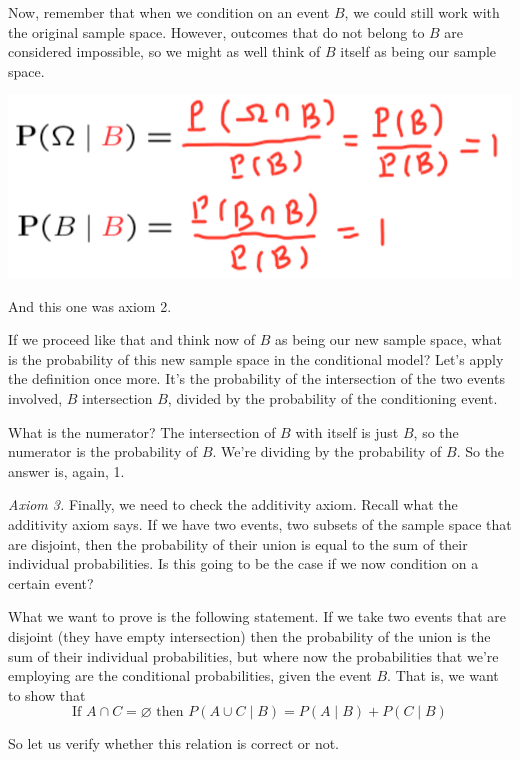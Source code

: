 \documentclass{tufte-handout}
\begin{document}
Now, remember that when we condition on an event $B$, we could still work with the original sample
space. However, outcomes that do not belong to $B$ are considered impossible, so we might as
well think of $B$ itself as being our sample space.

\begin{marginfigure}
  \includegraphics{CondProbAx2}
  \caption{And this one was axiom 2.}
\end{marginfigure}

If we proceed like that and think now of $B$ as being our new sample space, what is the probability of this
new sample space in the conditional model? Let's apply the definition once more. It's the probability of
the intersection of the two events involved, $B$ intersection $B$, divided by the probability of the
conditioning event.

What is the numerator? The intersection of $B$ with itself is just $B$, so the numerator is the probability of $B$.
We're dividing by the probability of $B$. So the answer is, again, 1. 

\vspace{0.2cm}

\textit{Axiom 3.} Finally, we need to check the additivity axiom. Recall what the additivity axiom says. If we have two
events, two subsets of the sample space that are disjoint, then the probability of their union is equal to
the sum of their individual probabilities. Is this going to be the case if we now condition on a certain
event? 

What we want to prove is the following statement. If we take two events that are disjoint (they have empty intersection)
then the probability of the union is
the sum of their individual probabilities, but where now the probabilities that we're employing are the
conditional probabilities, given the event $B$. That is, we want to show that
$$
\text{If } A \cap C  = \varnothing \text{ then } P( A \cup C \mid B) = P (A \mid B) + P (C \mid B)
$$


So let us verify whether this relation is correct or not.
\end{document}
